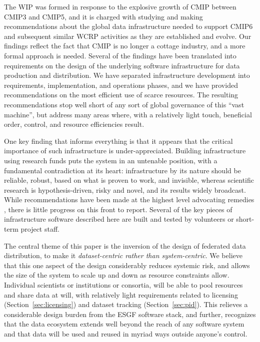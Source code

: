 \documentclass[gmd,manuscript]{copernicus}
\begin{document}
\label{sec:summary}

The WIP was formed in response to the explosive growth of CMIP between
CMIP3 and CMIP5, and it is charged with studying and making recommendations
about the global data infrastructure needed to support CMIP6 and 
subsequent similar WCRP activities as they are established and evolve.
Our findings reflect the
fact that CMIP is no longer a cottage industry, and a more formal
approach is needed. Several of the findings have been translated into
requirements on the design of the underlying software infrastructure
for data production and distribution. We have separated infrastructure
development into requirements, implementation, and operations phases,
and we have provided recommendations on the most efficient use of scarce
resources. The resulting recommendations stop well short of any sort
of global governance of this ``vast machine'', but address many areas
where, with a relatively light touch, beneficial order, control,
and resource efficiencies result.

One key finding that informs everything is that it
appears that the critical importance of such infrastructure is
under-appreciated. Building infrastructure using research funds puts
the system in an untenable position, with a fundamental contradiction
at its heart: infrastructure by its nature should be reliable, robust,
based on what is proven to work, and invisible, whereas scientific
research is hypothesis-driven, risky and novel, and its results widely
broadcast. While recommendations have been made at the highest level
advocating remedies
\citep[e.g.,][]{ref:nasem2012}, there is little progress on this front
to report. Several of the key pieces of infrastructure software
described here are built and tested by volunteers or short-term
project staff.

The central theme of this paper is the inversion of the design of
federated data distribution, to make it \emph{dataset-centric rather
  than system-centric}. We believe that this one aspect of the design
considerably reduces systemic risk, and allows the size of the system
to scale up and down as resource constraints allow. Individual
scientists or institutions or consortia, will be able to pool
resources and share data at will, with relatively light requirements
related to licensing (Section~\ref{sec:licensing}) and dataset
tracking (Section~\ref{sec:pid}). This relieves a considerable design
burden from the ESGF software stack, and further, recognizes that the
data ecosystem extends well beyond the reach of any software system
and that data will be used and reused in myriad ways outside anyone's
control.
\end{document}
